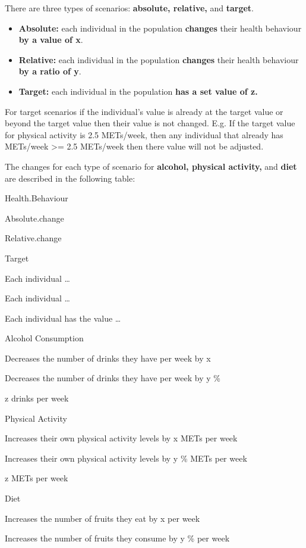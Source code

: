 \documentclass[]{book}
\providecommand{\tightlist}{%
  \setlength{\itemsep}{0pt}\setlength{\parskip}{0pt}}
\begin{document}
There are three types of scenarios: \textbf{absolute, relative,} and
\textbf{target}.

\begin{itemize}
\tightlist
\item
  \textbf{Absolute:} each individual in the population \textbf{changes}
  their health behaviour \textbf{by a value of x}.
\item
  \textbf{Relative:} each individual in the population \textbf{changes}
  their health behaviour \textbf{by a ratio of y}.
\item
  \textbf{Target:} each individual in the population \textbf{has a set
  value of z.}
\end{itemize}

For target scenarios if the individual's value is already at the target
value or beyond the target value then their value is not changed. E.g.
If the target value for physical activity is 2.5 METs/week, then any
individual that already has METs/week \textgreater{}= 2.5 METs/week then
there value will not be adjusted.

The changes for each type of scenario for \textbf{alcohol, physical
activity,} and \textbf{diet} are described in the following table:

Health.Behaviour

Absolute.change

Relative.change

Target

Each individual \ldots{}

Each individual \ldots{}

Each individual has the value \ldots{}

Alcohol Consumption

Decreases the number of drinks they have per week by x

Decreases the number of drinks they have per week by y \%

z drinks per week

Physical Activity

Increases their own physical activity levels by x METs per week

Increases their own physical activity levels by y \% METs per week

z METs per week

Diet

Increases the number of fruits they eat by x per week

Increases the number of fruits they consume by y \% per week
\end{document}
